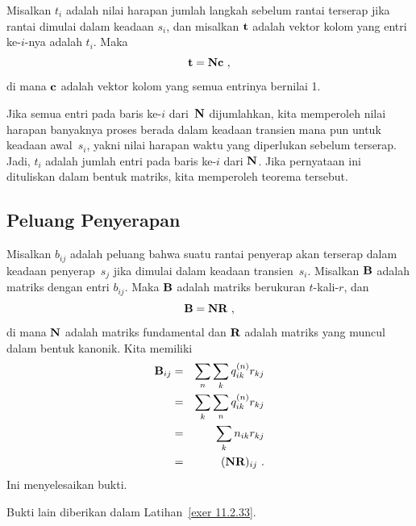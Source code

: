 \begin{theorem}\label{thm 11.2.2.5} Misalkan $t_i$ adalah nilai harapan jumlah
langkah sebelum rantai terserap jika rantai dimulai dalam keadaan $s_i$, dan
misalkan ${\mbox{\bf t}\/}$ adalah vektor kolom yang entri ke-$i$-nya adalah $t_i$. Maka
$${\mbox{\bf t}\/} = {\mbox{\bf N}\/}{\mbox{\bf c}\/}\ ,$$
di mana ${\mbox{\bf c}\/}$ adalah vektor kolom yang semua entrinya bernilai 1.

\proof
Jika semua entri pada baris ke-$i$ dari~${\mbox{\bf N}\/}$ dijumlahkan, kita memperoleh
nilai harapan banyaknya proses berada dalam keadaan transien mana pun untuk
keadaan awal~$s_i$, yakni nilai harapan waktu yang diperlukan sebelum terserap.
Jadi, $t_i$ adalah jumlah entri pada baris ke-$i$ dari ${\mbox{\bf N}\/}$. Jika pernyataan
ini dituliskan dalam bentuk matriks, kita memperoleh teorema tersebut.
\end{theorem}

\subsection*{Peluang Penyerapan}
\begin{theorem}\label{thm 11.2.3}
Misalkan $b_{ij}$ adalah peluang bahwa suatu rantai penyerap akan terserap dalam
keadaan penyerap~$s_j$ jika dimulai dalam keadaan transien~$s_i$. Misalkan
${\mbox{\bf B}\/}$ adalah matriks dengan entri $b_{ij}$. Maka ${\mbox{\bf B}\/}$ adalah matriks
berukuran $t$-kali-$r$, dan
$$
{\mbox{\bf B}\/} = {\mbox{\bf N}\/} {\mbox{\bf R}\/}\ ,
$$
di mana ${\mbox{\bf N}\/}$ adalah matriks fundamental dan ${\mbox{\bf R}\/}$ adalah matriks yang
muncul dalam bentuk kanonik.
\proof
Kita memiliki
\begin{eqnarray*}
{\mbox{\bf B}\/}_{ij} &=& \sum_n\sum_k q_{ik}^{(n)} r_{kj} \\
&=& \sum_k \sum_n q_{ik}^{(n)} r_{kj} \\
&=& \sum_k n_{ik}r_{kj} \\
&=& ({\mbox{\bf N}\/}{\mbox{\bf R}\/})_{ij}\ .
\end{eqnarray*}
Ini menyelesaikan bukti.
\end{theorem}
\par
Bukti lain diberikan dalam Latihan~\ref{exer 11.2.33}.

